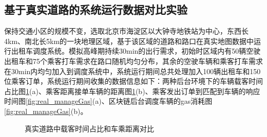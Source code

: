 \subsection{基于真实道路的系统运行数据对比实验}
保持交通小区的规模不变，选取北京市海淀区以大钟寺地铁站为中心，东西长4km、南北长5km的一块地理区域，基于该区域的道路和路口在真实地图数据中运行出租车调度系统。模拟高峰期持续30min的出行需求，初始时区域内有50辆空驶出租车和75个乘客打车需求在路口随机均匀分布，其余的空驶车辆和乘客打车需求在30min内均匀加入到调度系统中，系统运行期间总共处理加入100辆出租车和150位乘客订单，系统运行期间收集的数据信息如下：两种后台环境下的车辆载客时间占比图\ref{fig:real_timeDistance}(a)、乘客距离接单车辆的距离图\ref{fig:real_timeDistance}(b)、乘客发出订单到匹配到车辆的响应时间图\ref{fig:real_manageGas}(a)、区块链后台调度车辆的gas消耗图\ref{fig:real_manageGas}(b)。

\begin{figure}[h]
  \centering
  \caption{真实道路中载客时间占比和车乘距离对比}
  \label{fig:real_timeDistance}
\end{figure}

